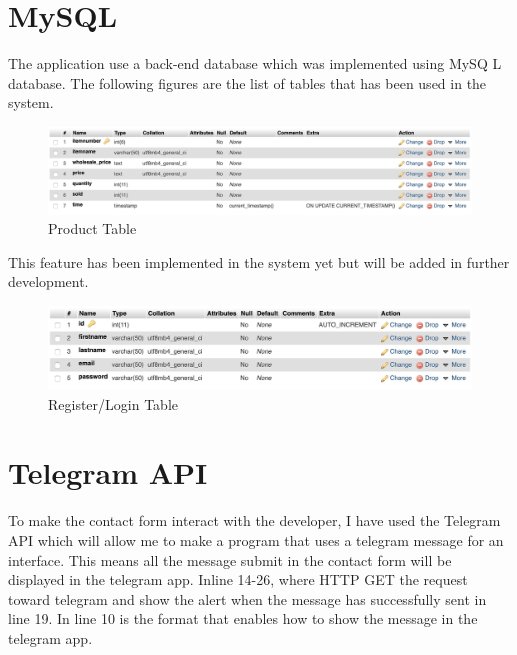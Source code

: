 \section{MySQL}
The application use a back-end database which was implemented using MySQ L database. The following figures are the list of tables that has been used in the system.
\begin{figure}[H]
\centering
    \includegraphics[scale=0.34]
    {implement_image/product.png}
    \caption{Product Table}
    \label{fig:Product Table}
\end{figure}

This feature has been implemented in the system yet but will be added in further development.
\begin{figure}[H]
\centering
    \includegraphics[scale=0.4]
    {implement_image/register.png}
    \caption{Register/Login Table}
    \label{fig:Register/Login Table}
\end{figure}


\section{Telegram API}
To make the contact form interact with the developer, I have used the Telegram API which will allow me to make a program that uses a telegram message for an interface. This means all the message submit in the contact form will be displayed in the telegram app. Inline 14-26, where HTTP GET the request toward telegram and show the alert when the message has successfully sent in line 19. In line 10 is the format that enables how to show the message in the telegram app.

